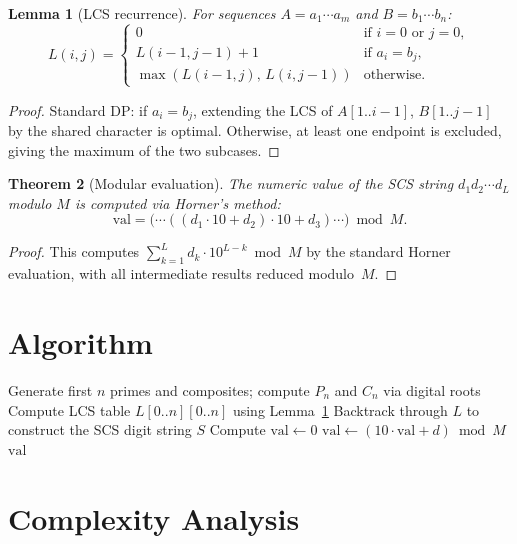 \documentclass[11pt]{article}
\newtheorem{theorem}{Theorem}
\newtheorem{lemma}[theorem]{Lemma}
\begin{document}
\begin{lemma}[LCS recurrence]
\label{lem:lcs}
For sequences $A = a_1 \cdots a_m$ and $B = b_1 \cdots b_n$:
\[
L(i,j) = \begin{cases}
0 & \text{if } i = 0 \text{ or } j = 0, \\
L(i{-}1, j{-}1) + 1 & \text{if } a_i = b_j, \\
\max(L(i{-}1,j),\, L(i,j{-}1)) & \text{otherwise}.
\end{cases}
\]
\end{lemma}

\begin{proof}
Standard DP: if $a_i = b_j$, extending the LCS of $A[1..i{-}1]$, $B[1..j{-}1]$ by the shared character is optimal. Otherwise, at least one endpoint is excluded, giving the maximum of the two subcases.
\end{proof}

\begin{theorem}[Modular evaluation]
\label{thm:mod}
The numeric value of the SCS string $d_1 d_2 \cdots d_L$ modulo $M$ is computed via Horner's method:
\[
\mathrm{val} = \bigl(\cdots((d_1 \cdot 10 + d_2) \cdot 10 + d_3) \cdots\bigr) \bmod M.
\]
\end{theorem}

\begin{proof}
This computes $\sum_{k=1}^{L} d_k \cdot 10^{L-k} \bmod M$ by the standard Horner evaluation, with all intermediate results reduced modulo~$M$.
\end{proof}

\section{Algorithm}

\begin{algorithm}[H]
\caption{Compute $f(n) \bmod M$}
\begin{algorithmic}[1]
\State Generate first $n$ primes and composites; compute $P_n$ and $C_n$ via digital roots
\State Compute LCS table $L[0..n][0..n]$ using Lemma~\ref{lem:lcs}
\State Backtrack through $L$ to construct the SCS digit string $S$
\State Compute $\mathrm{val} \gets 0$
    \State $\mathrm{val} \gets (10 \cdot \mathrm{val} + d) \bmod M$
\EndFor
\State \Return $\mathrm{val}$
\end{algorithmic}
\end{algorithm}

\section{Complexity Analysis}
\end{document}
